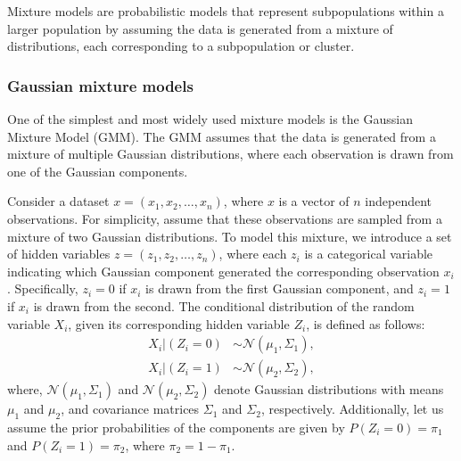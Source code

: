 Mixture models are probabilistic models that represent subpopulations within a larger population by assuming the data is generated from a mixture of distributions, each corresponding to a subpopulation or cluster.

\subsubsection{Gaussian mixture models}

One of the simplest and most widely used mixture models is the Gaussian Mixture Model (GMM). The GMM assumes that the data is generated from a mixture of multiple Gaussian distributions, where each observation is drawn from one of the Gaussian components. 

Consider a dataset $x = (x_1, x_2, \ldots, x_n)$, where $x$ is a vector of $n$ independent observations. For simplicity, assume that these observations are sampled from a mixture of two Gaussian distributions. To model this mixture, we introduce a set of hidden variables $z = (z_1, z_2, \ldots, z_n)$, where each $z_i$ is a categorical variable indicating which Gaussian component generated the corresponding observation $x_i$. Specifically, $z_i = 0$ if $x_i$ is drawn from the first Gaussian component, and $z_i = 1$ if $x_i$ is drawn from the second. The conditional distribution of the random variable $X_i$, given its corresponding hidden variable $Z_i$, is defined as follows:
\begin{align}
    X_i \vert (Z_i = 0) &\sim \mathcal{N}(\mu_1, \Sigma_1), \nonumber \\
    X_i \vert (Z_i = 1) &\sim \mathcal{N}(\mu_2, \Sigma_2), \nonumber
\end{align}
where, $\mathcal{N}(\mu_1, \Sigma_1)$ and $\mathcal{N}(\mu_2, \Sigma_2)$ denote Gaussian distributions with means $\mu_1$ and $\mu_2$, and covariance matrices $\Sigma_1$ and $\Sigma_2$, respectively. Additionally, let us assume the prior probabilities of the components are given by $P(Z_i = 0) = \pi_1$ and $P(Z_i = 1) = \pi_2$, where $\pi_2 = 1 - \pi_1$.

